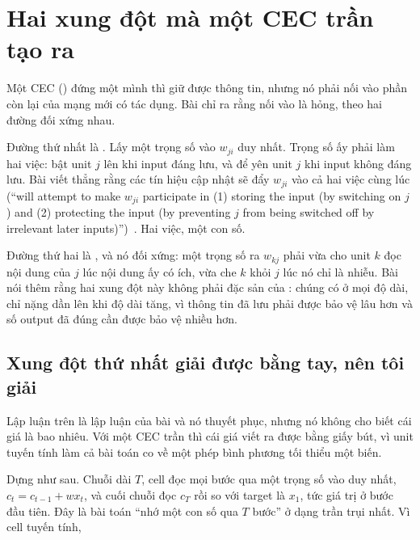 \section{Hai xung đột mà một CEC trần tạo ra}
\label{sec:ch04-hai-xung-dot}

%
Một CEC () đứng một mình
thì giữ được thông tin, nhưng nó phải nối vào phần còn lại của mạng mới có tác
dụng. Bài chỉ ra rằng nối vào là hỏng, theo hai đường đối xứng nhau.

Đường thứ nhất là . Lấy một
trọng số vào \(w_{ji}\) duy nhất. Trọng số ấy phải làm hai việc: bật unit
\(j\) lên khi input đáng lưu, và để yên unit \(j\) khi input không đáng lưu.
Bài viết thẳng rằng các tín hiệu cập nhật sẽ đẩy \(w_{ji}\) vào cả hai việc
cùng lúc (\enquote{will attempt to make \(w_{ji}\) participate in (1) storing
the input (by switching on \(j\)) and (2) protecting the input (by preventing
\(j\) from being switched off by irrelevant later
inputs)})~\autocite{hochreiter1997lstm}. Hai việc, một con số.

%
Đường thứ hai là , và nó đối
xứng: một trọng số ra \(w_{kj}\) phải vừa cho unit \(k\) đọc nội dung của \(j\)
lúc nội dung ấy có ích, vừa che \(k\) khỏi \(j\) lúc nó chỉ là nhiễu. Bài nói
thêm rằng hai xung đột này không phải đặc sản của :
chúng có ở mọi độ dài, chỉ nặng dần lên khi độ dài tăng, vì thông tin đã lưu
phải được bảo vệ lâu hơn và số output đã đúng cần được bảo vệ nhiều hơn.

\subsection*{Xung đột thứ nhất giải được bằng tay, nên tôi giải}

%
Lập luận trên là lập luận của bài và nó thuyết phục, nhưng nó không cho biết
cái giá là bao nhiêu. Với một CEC trần thì cái giá viết ra được bằng giấy bút,
vì unit tuyến tính làm cả bài toán co về một phép bình phương tối thiểu một
biến.

Dựng như sau. Chuỗi dài \(T\), cell đọc mọi bước qua một trọng số vào duy nhất,
\(c_t = c_{t-1} + w x_t\), và cuối chuỗi đọc \(c_T\) rồi so với target là
\(x_1\), tức giá trị ở bước đầu tiên. Đây là bài toán \enquote{nhớ một con số
qua \(T\) bước} ở dạng trần trụi nhất. Vì cell tuyến tính,

